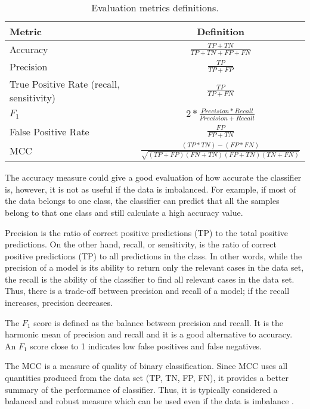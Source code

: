 \begin{table}[ht]
    \centering
    \begin{tabular}{ |l|c| } 
        \hline
        \textbf{Metric} & \textbf{Definition} \\
        \hline
        Accuracy & $\frac{TP + TN}{TP + TN + FP + FN}$ \\ 
        \hline
        Precision & $\frac{TP}{TP + FP}$ \\
        \hline
        True Positive Rate (recall, sensitivity) & $\frac{TP}{TP + FN}$ \\ 
        \hline
        $F_{1}$ & $2 * \frac{Precision * Recall}{Precision + Recall}$ \\
        \hline
        False Positive Rate & $\frac{FP}{FP + TN}$ \\
        \hline
        MCC & $\frac{(TP*TN)-(FP*FN)}{\sqrt{(TP + FP)(FN + TN)(FP + TN)(TN + FN)}}$ \\
        \hline
    \end{tabular}
    \caption{Evaluation metrics definitions.}
    \label{tab:evaluation}
\end{table}

The accuracy measure could give a good evaluation of how accurate the classifier is, however, it is not as useful if the data is imbalanced. For example, if most of the data belongs to one class, the classifier can predict that all the samples belong to that one class and still calculate a high accuracy value.

Precision is the ratio of correct positive predictions (TP) to the total positive predictions. On the other hand, recall, or sensitivity, is the ratio of correct positive predictions (TP) to all predictions in the class. In other words, while the precision of a model is its ability to return only the relevant cases in the data set, the recall is the ability of the classifier to find all relevant cases in the data set. Thus, there is a trade-off between precision and recall of a model; if the recall increases, precision decreases.

The $F_{1}$ score is defined as the balance between precision and recall. It is the harmonic mean of precision and recall and it is a good alternative to accuracy. An $F_{1}$ score close to 1 indicates low false positives and false negatives.

The \ac{MCC} is a measure of quality of binary classification. Since \ac{MCC} uses all quantities produced from the data set (TP, TN, FP, FN), it provides a better summary of the performance of classifier. Thus, it is typically considered a balanced and robust measure which can be used even if the data is imbalance \cite{boughorbel_optimal_2017}.

